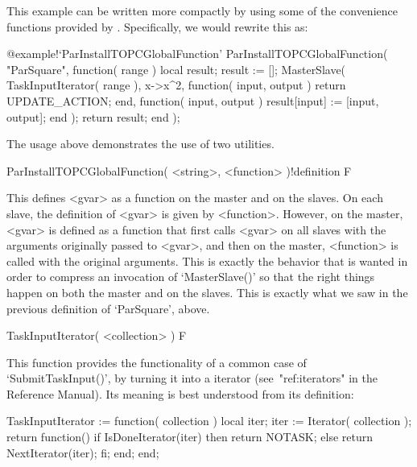
This example can be written more compactly by using some of the
convenience functions provided by {\ParGAP}.  Specifically, we would
rewrite this as:

%
{@example!\noexpand`ParInstallTOPCGlobalFunction'}
\beginexample
ParInstallTOPCGlobalFunction( "ParSquare", function( range )
  local result;
  result := [];
  MasterSlave( TaskInputIterator( range ),
               x->x^2,
               function( input, output ) return UPDATE_ACTION; end, 
               function( input, output ) result[input] := [input, output]; end
             );
  return result;
end );
\endexample

The usage above demonstrates the use of two utilities.

\>ParInstallTOPCGlobalFunction( <string>, <function> )!{definition} F

This defines <gvar> as a function on the master and on the slaves.
On each slave, the definition of <gvar> is given by <function>.
However, on the master, <gvar> is defined as a function that first
calls <gvar> on all slaves with the arguments originally passed
to <gvar>, and then on the master, <function> is called with the
original arguments.  This is exactly the behavior that is wanted
in order to compress an invocation of `MasterSlave()' so that the
right things happen on both the master and on the slaves.  This
is exactly what we saw in the previous definition of `ParSquare',
above.

\>TaskInputIterator( <collection> ) F

This function provides the functionality of a common case of
`SubmitTaskInput()', by turning it into a {\GAP} iterator
(see~"ref:iterators" in the Reference Manual).  Its meaning is best 
understood from its definition:

\begintt
TaskInputIterator := function( collection )
  local iter;
  iter := Iterator( collection );
  return function()
           if IsDoneIterator(iter) then return NOTASK;
           else return NextIterator(iter);
           fi;
         end;
end;
\endtt

